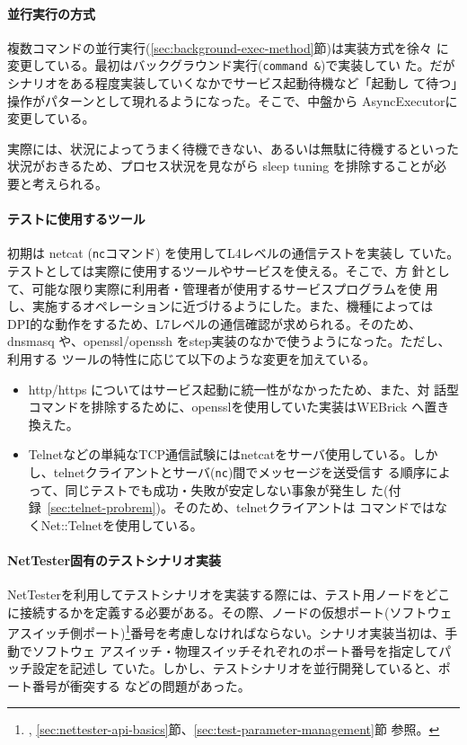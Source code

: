     \paragraph{並行実行の方式}

複数コマンドの並行実行(\ref{sec:background-exec-method}節)は実装方式を徐々
に変更している。最初はバックグラウンド実行(\verb|command &|)で実装してい
た。だがシナリオをある程度実装していくなかでサービス起動待機など「起動し
て待つ」操作がパターンとして現れるようになった。そこで、中盤から
AsyncExecutorに変更している。

実際には、状況によってうまく待機できない、あるいは無駄に待機するといった
状況がおきるため、プロセス状況を見ながら sleep tuning を排除することが必
要と考えられる。

    \paragraph{テストに使用するツール}

初期は netcat (\verb|nc|コマンド) を使用してL4レベルの通信テストを実装し
ていた。テストとしては実際に使用するツールやサービスを使える。そこで、方
針として、可能な限り実際に利用者・管理者が使用するサービスプログラムを使
用し、実施するオペレーションに近づけるようにした。また、機種によっては
DPI的な動作をするため、L7レベルの通信確認が求められる。そのため、dnsmasq
や、openssl/openssh をstep実装のなかで使うようになった。ただし、利用する
ツールの特性に応じて以下のような変更を加えている。
\begin{itemize}
 \item http/https についてはサービス起動に統一性がなかったため、また、対
       話型コマンドを排除するために、opensslを使用していた実装はWEBrick
       へ置き換えた。
 \item Telnetなどの単純なTCP通信試験にはnetcatをサーバ使用している。しか
       し、telnetクライアントとサーバ(\verb|nc|)間でメッセージを送受信す
       る順序によって、同じテストでも成功・失敗が安定しない事象が発生し
       た(付録~\ref{sec:telnet-probrem})。そのため、telnetクライアントは
       コマンドではなくNet::Telnetを使用している。
\end{itemize}

\paragraph{NetTester固有のテストシナリオ実装}
NetTesterを利用してテストシナリオを実装する際には、テスト用ノードをどこ
に接続するかを定義する必要がある。その際、ノードの仮想ポート(ソフトウェ
アスイッチ側ポート)\footnote{,
\ref{sec:nettester-api-basics}節、\ref{sec:test-parameter-management}節
参照。}番号を考慮しなければならない。シナリオ実装当初は、手動でソフトウェ
アスイッチ・物理スイッチそれぞれのポート番号を指定してパッチ設定を記述し
ていた。しかし、テストシナリオを並行開発していると、ポート番号が衝突する
などの問題があった。

